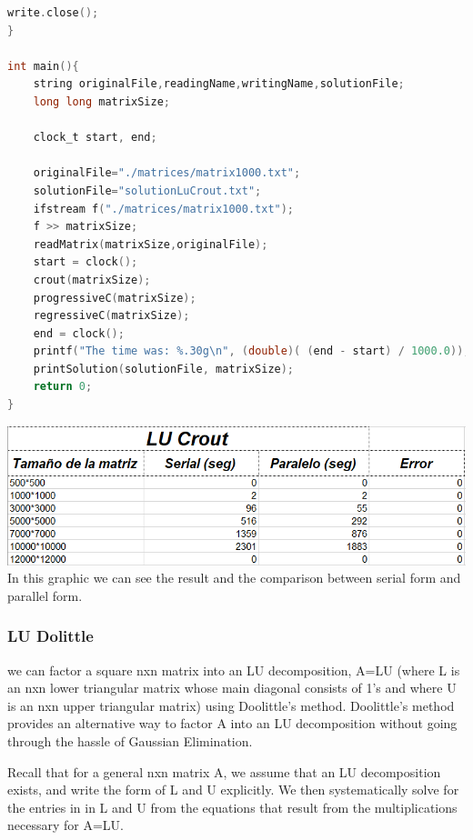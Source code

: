 \documentclass{article}
\newcounter{subsubsubsection}[subsubsection]
\begin{document}
\begin{lstlisting}[language=C]
    write.close();
}

int main(){
	string originalFile,readingName,writingName,solutionFile;
    long long matrixSize;

    clock_t start, end; 

    originalFile="./matrices/matrix1000.txt";
    solutionFile="solutionLuCrout.txt";
    ifstream f("./matrices/matrix1000.txt");
    f >> matrixSize;  
    readMatrix(matrixSize,originalFile);
    start = clock();
    crout(matrixSize);
    progressiveC(matrixSize);
    regressiveC(matrixSize);
    end = clock(); 
    printf("The time was: %.30g\n", (double)( (end - start) / 1000.0)); 
    printSolution(solutionFile, matrixSize);
	return 0;
}
\end{lstlisting}


\includegraphics[width=\linewidth]{./images/crout.png}\\
In this graphic we can see the result and the comparison between serial form and parallel form.

\newpage

\subsubsection{LU Dolittle}


we can factor a square nxn matrix into an LU decomposition, A=LU (where L is an nxn lower triangular matrix whose main diagonal consists of 1's and where U is an nxn upper triangular matrix) using Doolittle's method. Doolittle's method provides an alternative way to factor A into an LU decomposition without going through the hassle of Gaussian Elimination.

Recall that for a general nxn matrix A, we assume that an LU decomposition exists, and write the form of L and U explicitly. We then systematically solve for the entries in in L and U from the equations that result from the multiplications necessary for A=LU.
\end{document}
